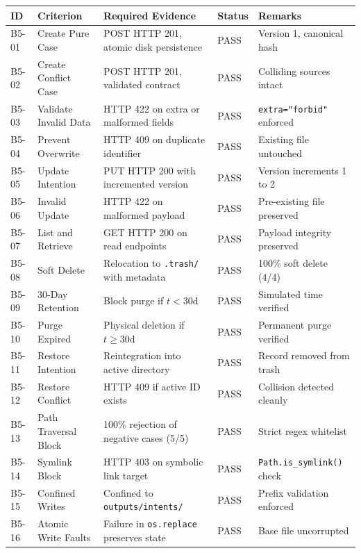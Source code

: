 \documentclass[11pt,a4paper]{article}
\begin{document}
\begin{table}[H]
\centering
\small
\begin{tabularx}{\textwidth}{p{1.1cm}p{3.3cm}Xp{1.5cm}p{3.2cm}}
\toprule
\textbf{ID} & \textbf{Criterion} & \textbf{Required Evidence} & \textbf{Status} & \textbf{Remarks} \\
\midrule
B5-01 & Create Pure Case & POST HTTP 201, atomic disk persistence & PASS & Version 1, canonical hash \\
B5-02 & Create Conflict Case & POST HTTP 201, validated contract & PASS & Colliding sources intact \\
B5-03 & Validate Invalid Data & HTTP 422 on extra or malformed fields & PASS & \texttt{extra="forbid"} enforced \\
B5-04 & Prevent Overwrite & HTTP 409 on duplicate identifier & PASS & Existing file untouched \\
B5-05 & Update Intention & PUT HTTP 200 with incremented version & PASS & Version increments 1 to 2 \\
B5-06 & Invalid Update & HTTP 422 on malformed payload & PASS & Pre-existing file preserved \\
B5-07 & List and Retrieve & GET HTTP 200 on read endpoints & PASS & Payload integrity preserved \\
B5-08 & Soft Delete & Relocation to \texttt{.trash/} with metadata & PASS & 100\% soft delete (4/4) \\
B5-09 & 30-Day Retention & Block purge if $t < 30\text{d}$ & PASS & Simulated time verified \\
B5-10 & Purge Expired & Physical deletion if $t \ge 30\text{d}$ & PASS & Permanent purge verified \\
B5-11 & Restore Intention & Reintegration into active directory & PASS & Record removed from trash \\
B5-12 & Restore Conflict & HTTP 409 if active ID exists & PASS & Collision detected cleanly \\
B5-13 & Path Traversal Block & 100\% rejection of negative cases (5/5) & PASS & Strict regex whitelist \\
B5-14 & Symlink Block & HTTP 403 on symbolic link target & PASS & \texttt{Path.is\_symlink()} check \\
B5-15 & Confined Writes & Confined to \texttt{outputs/intents/} & PASS & Prefix validation enforced \\
B5-16 & Atomic Write Faults & Failure in \texttt{os.replace} preserves state & PASS & Base file uncorrupted \\

\end{tabularx}
\end{table}
\end{document}
